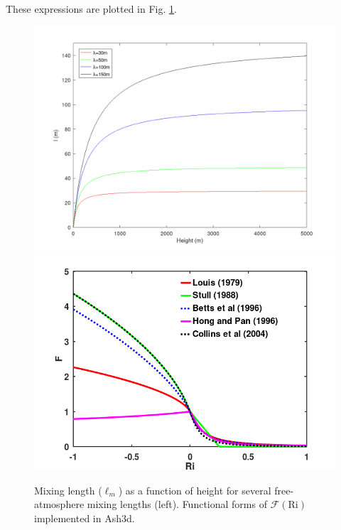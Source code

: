 These expressions are plotted in Fig. \ref{FigVarDiff_Kz_MixLen}.

\begin{figure}[htbp]\vspace*{0cm}\hspace*{0cm}
\includegraphics[angle=0,scale=0.3]{Figures/Apx_VarDiff/Kz_MixLen.png}
\includegraphics[angle=0,scale=0.3]{Figures/Apx_VarDiff/Kz_Fc.png}\\
\parbox{15cm}{\caption{\label{FigVarDiff_Kz_MixLen}
Mixing length ($\ell_m$) as a function of height for several free-atmosphere mixing lengths (left).
Functional forms of $\mathcal{F}(\mathrm{Ri})$ implemented in Ash3d.
}}
\end{figure}


